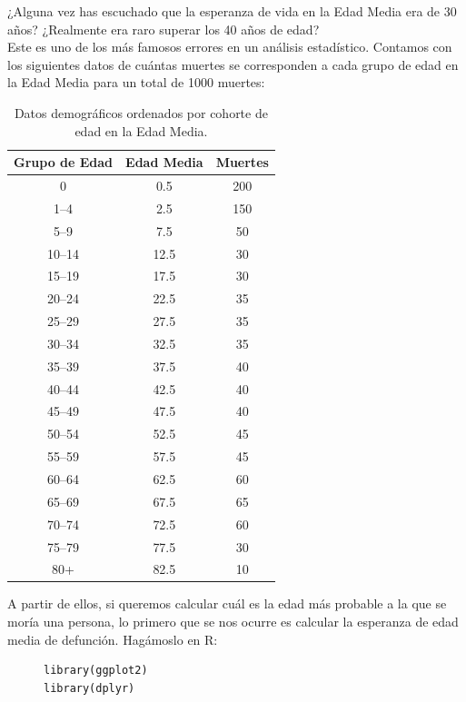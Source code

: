 \begin{ejemplo}
    ¿Alguna vez has escuchado que la esperanza de vida en la Edad Media era de 30 años? ¿Realmente era raro superar los 40 años de edad?\\

    \noindent
    Este es uno de los más famosos errores en un análisis estadístico. Contamos con los siguientes datos de cuántas muertes se corresponden a cada grupo de edad en la Edad Media para un total de 1000 muertes:
    \begin{table}[H]
        \centering
        \renewcommand{\arraystretch}{1.2}
        \begin{tabular}{c c c}
            \textbf{Grupo de Edad} & \textbf{Edad Media} & \textbf{Muertes} \\
            \hline
            0      & 0.5  & 200 \\
            1--4   & 2.5  & 150 \\
            5--9   & 7.5  & 50  \\
            10--14 & 12.5 & 30  \\
            15--19 & 17.5 & 30  \\
            20--24 & 22.5 & 35  \\
            25--29 & 27.5 & 35  \\
            30--34 & 32.5 & 35  \\
            35--39 & 37.5 & 40  \\
            40--44 & 42.5 & 40  \\
            45--49 & 47.5 & 40  \\
            50--54 & 52.5 & 45  \\
            55--59 & 57.5 & 45  \\
            60--64 & 62.5 & 60  \\
            65--69 & 67.5 & 65  \\
            70--74 & 72.5 & 60  \\
            75--79 & 77.5 & 30  \\
            80+    & 82.5 & 10  \\
        \end{tabular}
        \caption{Datos demográficos ordenados por cohorte de edad en la Edad Media.}
    \end{table}
    \noindent
    A partir de ellos, si queremos calcular cuál es la edad más probable a la que se moría una persona, lo primero que se nos ocurre es calcular la esperanza de edad media de defunción. Hagámoslo en R:
    \begin{figure}[H]
    \begin{verbatim}
library(ggplot2)
library(dplyr)


\end{verbatim}
\end{figure}
\end{ejemplo}
